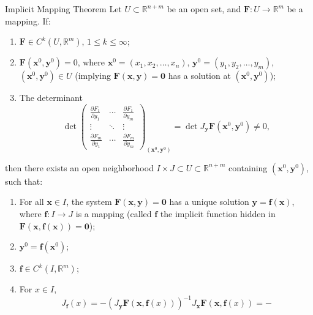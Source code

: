 \documentclass[11pt]{../../TexTemplate/elegantbook}
\begin{document}
\begin{theorem}{Implicit Mapping Theorem}
    Let \( U \subset \mathbb{R}^{n+m} \) be an open set, and \( \mathbf{F}: U \to \mathbb{R}^m \) be a mapping. If:
    \begin{enumerate}
        \item \( \mathbf{F} \in C^k(U, \mathbb{R}^m) \), \( 1 \leq k \leq \infty \);
        \item \( \mathbf{F}(\mathbf{x}^0, \mathbf{y}^0) = 0 \), 
            where \( \mathbf{x}^0 = (x_1, x_2, \dots, x_n) \), \( \mathbf{y}^0 = (y_1, y_2, \dots, y_m) \), 
            \( (\mathbf{x}^0, \mathbf{y}^0) \in U \) 
            (implying \( \mathbf{F}(\mathbf{x}, \mathbf{y}) = \mathbf{0} \) 
            has a solution at \( (\mathbf{x}^0, \mathbf{y}^0) \));
        \item The determinant
        \[
        \det
        \begin{pmatrix}
            \frac{\partial F_1}{\partial y_1} & \cdots & \frac{\partial F_1}{\partial y_m} \\
            \vdots & \ddots & \vdots \\
            \frac{\partial F_m}{\partial y_1} & \cdots & \frac{\partial F_m}{\partial y_m}
        \end{pmatrix}_{(\mathbf{x}^0, \mathbf{y}^0)}
        = \det J_{\mathbf{y}} \mathbf{F}(\mathbf{x}^0, \mathbf{y}^0) \neq 0,
        \]
    \end{enumerate}
    then there exists an open neighborhood \( I \times J \subset U \subset \mathbb{R}^{n+m} \) 
    containing \( (\mathbf{x}^0, \mathbf{y}^0) \), such that:
    \begin{enumerate}
        \item For all \( \mathbf{x} \in I \), the system \( \mathbf{F}(\mathbf{x}, \mathbf{y}) = \mathbf{0} \) 
            has a unique solution \( \mathbf{y} = \mathbf{f}(\mathbf{x}) \), 
            where \( \mathbf{f}: I \to J \) is a mapping 
            (called \( \mathbf{f} \) the implicit function hidden in 
            \( \mathbf{F}(\mathbf{x}, \mathbf{f}(\mathbf{x})) = \mathbf{0} \));
        \item \( \mathbf{y}^0 = \mathbf{f}(\mathbf{x}^0) \);
        \item \( \mathbf{f} \in C^k(I, \mathbb{R}^m) \);
        \item For \( x \in I \),
        \[
        J_{\mathbf{f}}(x) = 
            - (J_{\mathbf{y}} \mathbf{F}(\mathbf{x}, \mathbf{f}(x)))^{-1} J_{\mathbf{x}} \mathbf{F}(\mathbf{x}, \mathbf{f}(x))
        = -
\]
\end{enumerate}
\end{theorem}
\end{document}

